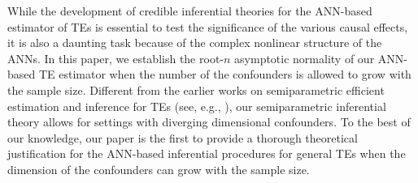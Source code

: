 \documentclass[11pt]{article}
\numberwithin{equation}{section}
\begin{document}

While the development of credible inferential
theories for the ANN-based estimator of TEs is essential to test the
significance of the various causal effects, it is also a daunting task because of the complex nonlinear structure of the ANNs. In this paper,
we establish the root-$n$ asymptotic normality of our ANN-based TE estimator when the number of the confounders is allowed to grow with the sample size.
Different from the earlier works on semiparametric efficient estimation and inference for TEs (see, e.g.,
\cite{robins1994estimation,Hirano03,chen2008semiparametric,ai2018unified}), our semiparametric inferential theory allows for settings with
diverging dimensional confounders. To the best of our knowledge, our paper is the first to provide a thorough theoretical justification for the ANN-based inferential procedures for general TEs when the dimension of the confounders can grow with the
sample size.
\end{document}
